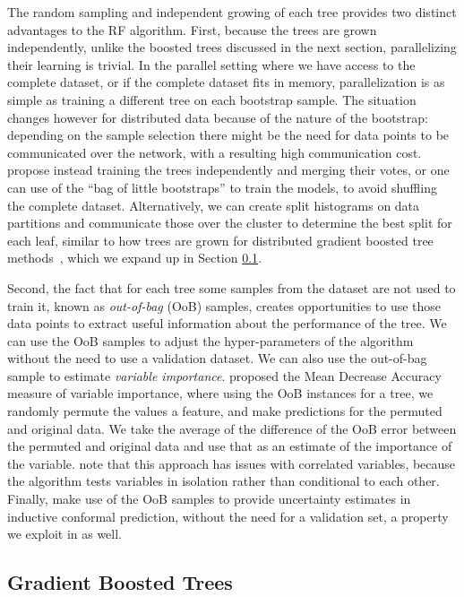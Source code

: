 The random sampling and independent growing of each tree provides two distinct advantages
to the RF algorithm. First, because the trees are grown independently, unlike the boosted trees
discussed in the next section, parallelizing their learning is trivial. In the parallel
setting where we have access to the complete dataset, or if the complete dataset
fits in memory, parallelization is as simple as training a different tree on
each bootstrap sample. The situation changes
however for distributed data because of the nature of the bootstrap: depending
on the sample selection there might be the need for data points to be communicated
over the network, with a resulting high communication cost.
\citet{ensembles-bites} propose instead training the trees independently
and merging their votes, or one can use of the ``bag of little bootstraps''
\cite{bag-of-boostraps} to train the models, to avoid shuffling the complete
dataset. Alternatively, we can create split
histograms on data partitions and communicate those over the cluster to determine the
best split for each leaf, similar to how trees are grown for distributed
gradient boosted tree methods~\cite{xgboost, lightgbm}, which we expand up in
Section \ref{sec:bg-dt-gbts}.

Second, the fact that for each tree some samples from the dataset are not
used to train it, known as \emph{out-of-bag} (OoB) samples, creates opportunities
to use those data points to extract useful information about the performance
of the tree. We can use the OoB samples to adjust the hyper-parameters of the
algorithm without the need to use a validation dataset. We can also use
the out-of-bag sample to estimate \emph{variable importance}.
\citet{random-forests} proposed the Mean Decrease Accuracy measure of
variable importance, where using the OoB instances for a tree, we
randomly permute the values a feature, and make predictions
for the permuted and original data. We take the average
of the difference of the OoB error between the permuted
and original data and use that as an estimate of the importance
of the variable. \citet{random-forest-survey} note that this approach has issues with correlated variables, because the
algorithm tests variables in isolation rather than conditional
to each other.
Finally, \citet{johansson2013conformal} make use of the OoB samples to provide
uncertainty estimates in inductive conformal prediction, without the need for a
validation set, a property we exploit in \uncertaintrees as well.

\subsection{Gradient Boosted Trees}
\label{sec:bg-dt-gbts}

